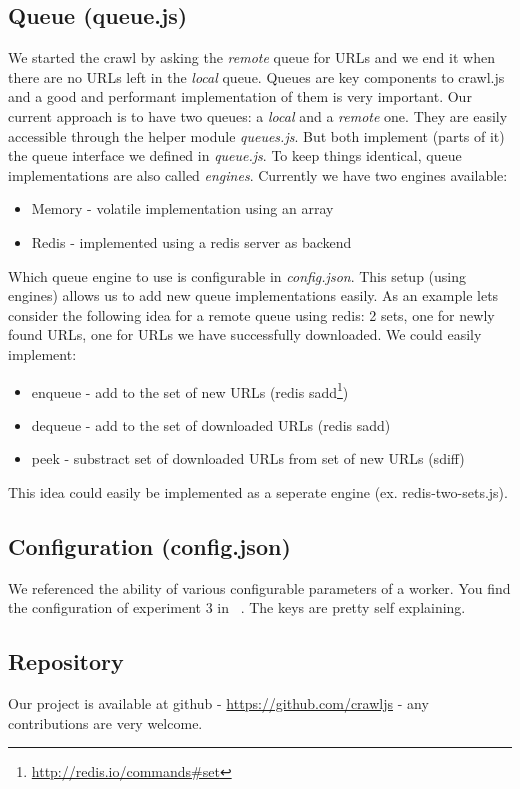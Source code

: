 \subsection{Queue (queue.js)}
We started the crawl by asking the \emph{remote} queue for URLs and we end it when there are no URLs left in the \emph{local} queue. Queues are key components to crawl.js and a good and performant implementation of them is very important. Our current approach is to have two queues: a \emph{local} and a \emph{remote} one. They are easily accessible through the helper module \emph{queues.js}. But both implement (parts of it) the queue interface we defined in \emph{queue.js}. To keep things identical, queue implementations are also called \emph{engines}. Currently we have two engines available:
\begin{itemize}
  \item Memory - volatile implementation using an array
  \item Redis - implemented using a redis server as backend
\end{itemize}
Which queue engine to use is configurable in \emph{config.json}. This setup (using engines) allows us to add new queue implementations easily. As an example lets consider the following idea for a remote queue using redis: 2 sets, one for newly found URLs, one for URLs we have successfully downloaded. We could easily implement:
\begin{itemize}
  \item enqueue - add to the set of new URLs (redis sadd\footnote{\url{http://redis.io/commands\#set}})
  \item dequeue - add to the set of downloaded URLs (redis sadd)
  \item peek - substract set of downloaded URLs from set of new URLs (sdiff)
\end{itemize}
This idea could easily be implemented as a seperate engine (ex. redis-two-sets.js).

\subsection{Configuration (config.json)}
We referenced the ability of various configurable parameters of a worker. You find the configuration of experiment 3 in ~. The keys are pretty self explaining.

\subsection{Repository}
Our project is available at github - \url{https://github.com/crawljs} - any contributions are very welcome.
